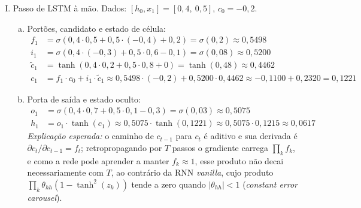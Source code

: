 \documentclass{dlproblemset}
\begin{document}
\begin{enumerate}[I)]
\item Passo de LSTM à mão. Dados: $[h_0, x_1] = [0{,}4,\ 0{,}5]$, $c_0 = -0{,}2$.
\begin{enumerate}[(a)]
    \item Portões, candidato e estado de célula:
    \begin{align*}
        f_1 &= \sigma(0{,}4 \cdot 0{,}5 + 0{,}5 \cdot (-0{,}4) + 0{,}2) = \sigma(0{,}2) \approx 0{,}5498 \\
        i_1 &= \sigma(0{,}4 \cdot (-0{,}3) + 0{,}5 \cdot 0{,}6 - 0{,}1) = \sigma(0{,}08) \approx 0{,}5200 \\
        \tilde{c}_1 &= \tanh(0{,}4 \cdot 0{,}2 + 0{,}5 \cdot 0{,}8 + 0) = \tanh(0{,}48) \approx 0{,}4462 \\
        c_1 &= f_1 \cdot c_0 + i_1 \cdot \tilde{c}_1 \approx 0{,}5498 \cdot (-0{,}2) + 0{,}5200 \cdot 0{,}4462 \approx -0{,}1100 + 0{,}2320 = 0{,}1221
    \end{align*}
    \item Porta de saída e estado oculto:
    \begin{align*}
        o_1 &= \sigma(0{,}4 \cdot 0{,}7 + 0{,}5 \cdot 0{,}1 - 0{,}3) = \sigma(0{,}03) \approx 0{,}5075 \\
        h_1 &= o_1 \cdot \tanh(c_1) \approx 0{,}5075 \cdot \tanh(0{,}1221) \approx 0{,}5075 \cdot 0{,}1215 \approx 0{,}0617
    \end{align*}
    \textit{Explicação esperada:} o caminho de $c_{t-1}$ para $c_t$ é aditivo e sua derivada é $\partial c_t / \partial c_{t-1} = f_t$; retropropagando por $T$ passos o gradiente carrega $\prod_k f_k$, e como a rede pode aprender a manter $f_k \approx 1$, esse produto não decai necessariamente com $T$, ao contrário da RNN \textit{vanilla}, cujo produto $\prod_k \theta_{hh}(1-\tanh^2(z_k))$ tende a zero quando $|\theta_{hh}| < 1$ (\textit{constant error carousel}).
\end{enumerate}

\end{enumerate}
\end{document}
